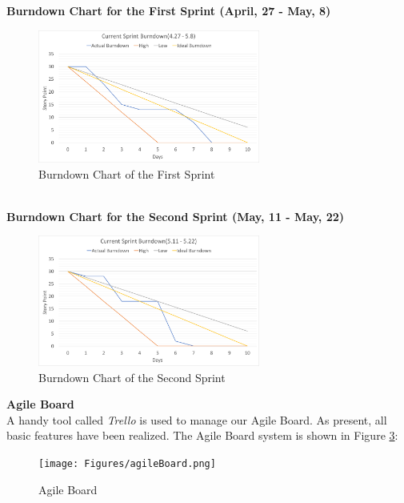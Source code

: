\clearpage
\textbf{Burndown Chart for the First Sprint (April, 27 - May, 8)}
\begin{figure}[htp]
\centering
\includegraphics[width=0.65\textwidth]{Figures/sprint1Burndown.pdf}
\caption{Burndown Chart of the First Sprint}
\label{fig:sprint1Burndown}
\end{figure}
\\
\textbf{Burndown Chart for the Second Sprint (May, 11 - May, 22)}
\begin{figure}[htp]
\centering
\includegraphics[width=0.65\textwidth]{Figures/sprint2Burndown.pdf}
\caption{Burndown Chart of the Second Sprint}
\label{fig:sprint2Burndown}
\end{figure}

\clearpage
\textbf{Agile Board}
\\
A handy tool called \textit{Trello} is used to manage our Agile Board. As present, all basic features have been realized. The Agile Board system is shown in Figure \ref{fig:agileBoard}:

\begin{figure}[htp]
\centering
\texttt{[image: Figures/agileBoard.png]}
\caption{Agile Board}
\label{fig:agileBoard}
\end{figure}

